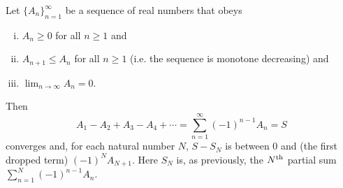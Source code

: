 \begin{theorem}\label{thm:SRalternating}
 Let $\big\{A_n\big\}_{n=1}^\infty$
be a sequence of real numbers that obeys
\begin{enumerate}[(i)]\itemsep1pt \parskip0pt  %
\item $A_n\ge 0$ for all $n\ge 1$ and
\item $A_{n+1}\le A_n$  for all $n\ge 1$ (i.e. the
sequence is monotone decreasing) and
\item $\lim_{n\rightarrow\infty}A_n=0$.
\end{enumerate}
Then
\begin{equation*}
A_1-A_2+A_3-A_4+\cdots=\sum\limits_{n=1}^\infty (-1)^{n-1} A_n =S
\end{equation*}
converges and, for each natural number $N$,  $S-S_N$ is between $0$ and (the
first dropped term) $(-1)^N A_{N+1}$. Here $S_N$ is, as previously,
the $N^{\rm th}$ partial sum $\sum\limits_{n=1}^N (-1)^{n-1} A_n$.
\end{theorem}
